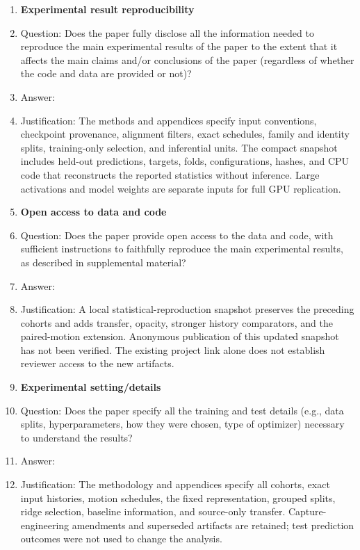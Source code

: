 \begin{enumerate}
    \item {\bf Experimental result reproducibility}
    \item[] Question: Does the paper fully disclose all the information needed to reproduce the main experimental results of the paper to the extent that it affects the main claims and/or conclusions of the paper (regardless of whether the code and data are provided or not)?
    \item[] Answer: \answerYes{}
    \item[] Justification: The methods and appendices specify input conventions, checkpoint provenance, alignment filters, exact schedules, family and identity splits, training-only selection, and inferential units. The compact snapshot includes held-out predictions, targets, folds, configurations, hashes, and CPU code that reconstructs the reported statistics without inference. Large activations and model weights are separate inputs for full GPU replication.


\item {\bf Open access to data and code}
    \item[] Question: Does the paper provide open access to the data and code, with sufficient instructions to faithfully reproduce the main experimental results, as described in supplemental material?
    \item[] Answer: \answerNo{}
    \item[] Justification: A local statistical-reproduction snapshot preserves the preceding cohorts and adds transfer, opacity, stronger history comparators, and the paired-motion extension. Anonymous publication of this updated snapshot has not been verified. The existing project link alone does not establish reviewer access to the new artifacts.


\item {\bf Experimental setting/details}
    \item[] Question: Does the paper specify all the training and test details (e.g., data splits, hyperparameters, how they were chosen, type of optimizer) necessary to understand the results?
    \item[] Answer: \answerYes{}
    \item[] Justification: The methodology and appendices specify all cohorts, exact input histories, motion schedules, the fixed representation, grouped splits, ridge selection, baseline information, and source-only transfer. Capture-engineering amendments and superseded artifacts are retained; test prediction outcomes were not used to change the analysis.



\end{enumerate}
